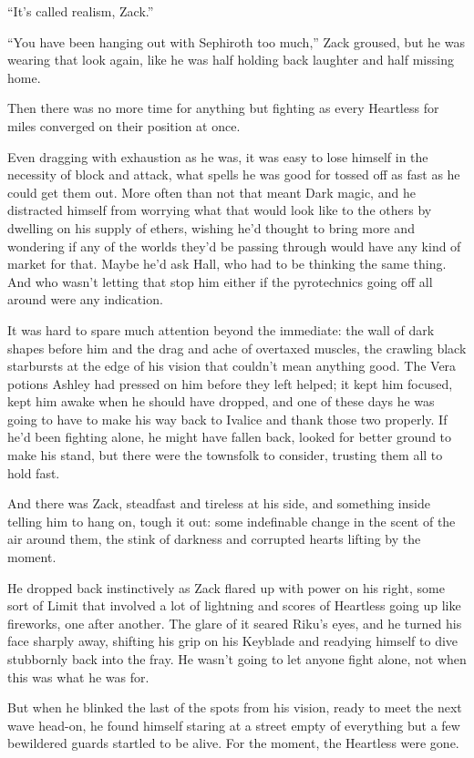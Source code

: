 ``It's called realism, Zack.''

``You have been hanging out with Sephiroth too much,'' Zack groused, but he was wearing that look again, like he was half holding back laughter and half missing home.

Then there was no more time for anything but fighting as every Heartless for miles converged on their position at once.

Even dragging with exhaustion as he was, it was easy to lose himself in the necessity of block and attack, what spells he was good for tossed off as fast as he could get them out. More often than not that meant Dark magic, and he distracted himself from worrying what that would look like to the others by dwelling on his supply of ethers, wishing he'd thought to bring more and wondering if any of the worlds they'd be passing through would have any kind of market for that. Maybe he'd ask Hall, who had to be thinking the same thing. And who wasn't letting that stop him either if the pyrotechnics going off all around were any indication.

It was hard to spare much attention beyond the immediate: the wall of dark shapes before him and the drag and ache of overtaxed muscles, the crawling black starbursts at the edge of his vision that couldn't mean anything good. The Vera potions Ashley had pressed on him before they left helped; it kept him focused, kept him awake when he should have dropped, and one of these days he was going to have to make his way back to Ivalice and thank those two properly. If he'd been fighting alone, he might have fallen back, looked for better ground to make his stand, but there were the townsfolk to consider, trusting them all to hold fast.

And there was Zack, steadfast and tireless at his side, and something inside telling him to hang on, tough it out: some indefinable change in the scent of the air around them, the stink of darkness and corrupted hearts lifting by the moment.

He dropped back instinctively as Zack flared up with power on his right, some sort of Limit that involved a lot of lightning and scores of Heartless going up like fireworks, one after another. The glare of it seared Riku's eyes, and he turned his face sharply away, shifting his grip on his Keyblade and readying himself to dive stubbornly back into the fray. He wasn't going to let anyone fight alone, not when this was what he was for.

But when he blinked the last of the spots from his vision, ready to meet the next wave head-on, he found himself staring at a street empty of everything but a few bewildered guards startled to be alive. For the moment, the Heartless were gone.

